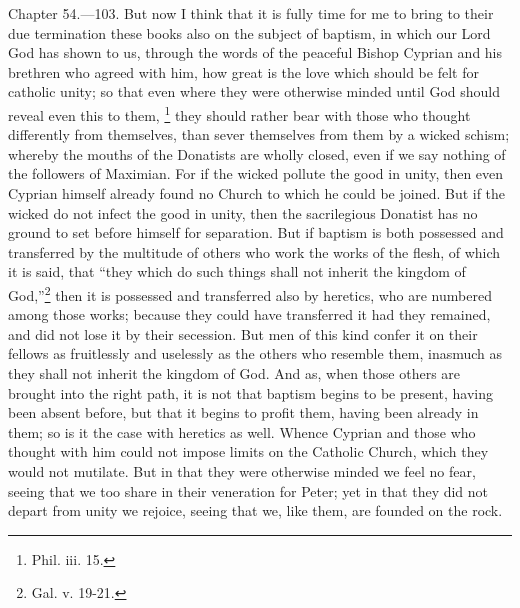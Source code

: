 
Chapter 54.—103. But now I think that it is fully time for me to bring to their due termination these books also on the subject of baptism, in which our Lord God has shown to us, through the words of the peaceful Bishop Cyprian and his brethren who agreed with him, how great is the love which should be felt for catholic unity; so that even where they were otherwise minded until God should reveal even this to them, \footnote{\par  Phil. iii. 15.} they should rather bear with those who thought differently from themselves, than sever themselves from them by a wicked schism; whereby the mouths of the Donatists are wholly closed, even if we say nothing of the followers of Maximian. For if the wicked pollute the good in unity, then even Cyprian himself already found no Church to which he could be joined. But if the wicked do not infect the good in unity, then the sacrilegious Donatist has no ground to set before himself for separation. But if baptism is both possessed and transferred by the multitude of others who work the works of the flesh, of which it is said, that ``they which do such things shall not inherit the kingdom of God,''\footnote{\par  Gal. v. 19-21.} then it is possessed and transferred also by heretics, who are numbered among those works; because they could have transferred it had they remained, and did not lose it by their secession. But men of this kind confer it on their fellows as fruitlessly and uselessly as the others who resemble them, inasmuch as they shall not inherit the kingdom of God. And as, when those others are brought into the right path, it is not that baptism begins to be present, having been absent before, but that it begins to profit them, having been already in them; so is it the case with heretics as well. Whence Cyprian and those who thought with him could not impose limits on the Catholic Church, which they would not mutilate. But in that they were otherwise minded we feel no fear, seeing that we too share in their veneration for Peter; yet in that they did not depart from unity we rejoice, seeing that we, like them, are founded on the rock.
